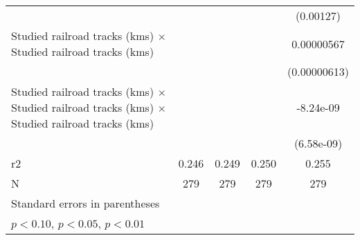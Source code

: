 {\begin{tabular}{l*{4}{c}}
                    &                     &                     &                     &   (0.00127)         \\
[1em]
Studied railroad tracks (kms) $\times$ Studied railroad tracks (kms)&                     &                     &                     &  0.00000567         \\
                    &                     &                     &                     &(0.00000613)         \\
[1em]
Studied railroad tracks (kms) $\times$ Studied railroad tracks (kms) $\times$ Studied railroad tracks (kms)&                     &                     &                     &   -8.24e-09         \\
                    &                     &                     &                     &  (6.58e-09)         \\
\hline
r2                  &       0.246         &       0.249         &       0.250         &       0.255         \\
N                   &         279         &         279         &         279         &         279         \\
\hline\hline
\multicolumn{5}{l}{\footnotesize Standard errors in parentheses}\\
\multicolumn{5}{l}{\footnotesize \sym{*} \(p<0.10\), \sym{**} \(p<0.05\), \sym{***} \(p<0.01\)}\\
\end{tabular}
}
